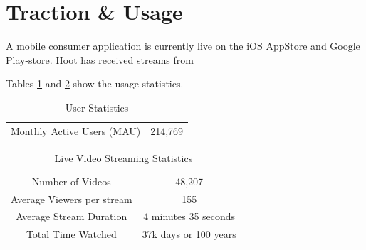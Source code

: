 \documentclass{article}
\begin{document}
\section{Traction \& Usage}
A mobile consumer application is currently live on the iOS AppStore and Google Play-store. Hoot has received streams from 


Tables \ref{table:1} and \ref{table:2} show the usage statistics.

\setlength{\arrayrulewidth}{.7mm}
\setlength{\tabcolsep}{18pt}
\renewcommand{\arraystretch}{2.0} 
 


\begin{table}[!htb]
\centering
\begin{tabular}{ |c|c| }
\hline
\rowcolor{lightgray} \multicolumn{2}{|c|}{User Statistics} \\
\hline
Monthly Active Users (MAU) & 214,769 \\
\hline
\end{tabular}
\caption{User Statistics}
\label{table:1}
\end{table}

\begin{table}[!htb]
\centering
\begin{tabular}{ |c|c| }
\hline
\rowcolor{lightgray} \multicolumn{2}{|c|}{Live Video Streaming Statistics} \\
\hline
Number of Videos & 48,207 \\
Average Viewers per stream & 155 \\
Average Stream Duration & 4 minutes 35 seconds \\
Total Time Watched & 37k days or 100 years \\
\hline
\end{tabular}
\caption{Live Video Streaming Statistics}
\label{table:2}
\end{table}

\end{document}
